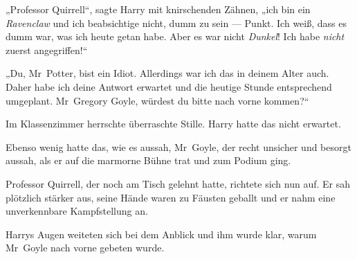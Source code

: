 „Professor Quirrell“, sagte Harry mit knirschenden Zähnen, „ich bin ein \emph{Ravenclaw} und ich beabsichtige nicht, dumm zu sein — Punkt. Ich weiß, dass es dumm war, was ich heute getan habe. Aber es war nicht \emph{Dunkel}! Ich habe \emph{nicht} zuerst angegriffen!“

„Du, Mr~Potter, bist ein Idiot. Allerdings war ich das in deinem Alter auch. Daher habe ich deine Antwort erwartet und die heutige Stunde entsprechend umgeplant. Mr~Gregory Goyle, würdest du bitte nach vorne kommen?“

Im Klassenzimmer herrschte überraschte Stille. Harry hatte das nicht erwartet.

Ebenso wenig hatte das, wie es aussah, Mr~Goyle, der recht unsicher und besorgt aussah, als er auf die marmorne Bühne trat und zum Podium ging.

Professor Quirrell, der noch am Tisch gelehnt hatte, richtete sich nun auf. Er sah plötzlich stärker aus, seine Hände waren zu Fäusten geballt und er nahm eine unverkennbare Kampfstellung an.

Harrys Augen weiteten sich bei dem Anblick und ihm wurde klar, warum Mr~Goyle nach vorne gebeten wurde.


